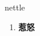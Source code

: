 
\begin{frame}
{\huge nettle}
\begin{center}
\begin{enumerate}\Large
  \item \textbf{惹怒}
\end{enumerate}
\end{center}
\end{frame}
